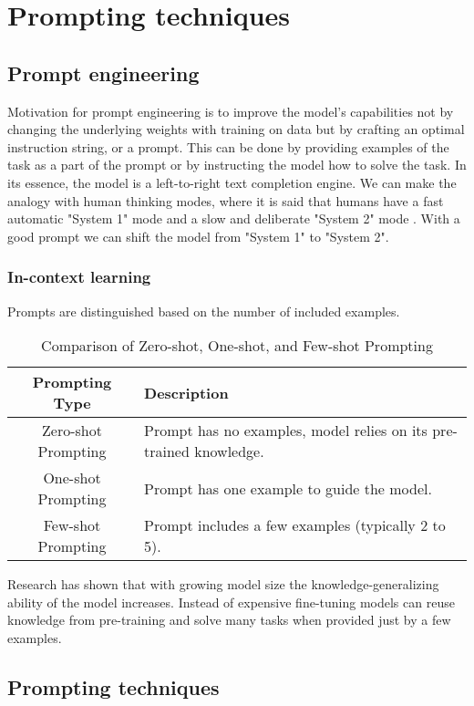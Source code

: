 \section{Prompting techniques}
\subsection{Prompt engineering}
Motivation for prompt engineering is to improve the model's capabilities not by changing the underlying weights with training on data but by crafting an optimal instruction string, or a prompt.
This can be done by providing examples of the task as a part of the prompt or by instructing the model how to solve the task.
In its essence, the model is a left-to-right text completion engine. We can make the analogy with human thinking modes, where it is said that humans
have a fast automatic "System 1" mode and a slow and deliberate "System 2" mode \cite{yao2023treethoughtsdeliberateproblem}. 
With a good prompt we can shift the model from "System 1" to "System 2".
\subsubsection{In-context learning}
Prompts are distinguished based on the number of included examples.
\begin{table}[h!]
    \centering
    \begin{tabular}{|c|p{12cm}|}
    \hline
    \textbf{Prompting Type} & \textbf{Description} \\
    \hline
    Zero-shot Prompting & Prompt has no examples, model relies on its pre-trained knowledge. \\
    \hline
    One-shot Prompting & Prompt has one example to guide the model. \\
    \hline
    Few-shot Prompting & Prompt includes a few examples (typically 2 to 5). \\
    \hline
    \end{tabular}
    \caption{Comparison of Zero-shot, One-shot, and Few-shot Prompting}
\end{table}        
Research\cite{brown2020languagemodelsfewshotlearners} has shown that with growing model size the knowledge-generalizing ability of the model increases. Instead of expensive fine-tuning
models can reuse knowledge from pre-training and solve many tasks when provided just by a few examples.
\subsection{Prompting techniques}
